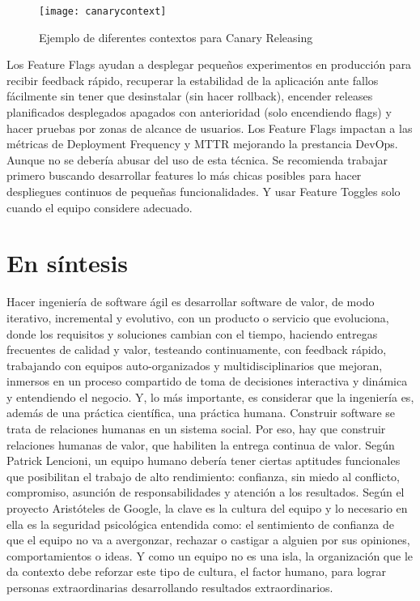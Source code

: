 \begin{itemize}
\begin{figure}[h]
  \centering
  \texttt{[image: canarycontext]}
  \caption{Ejemplo de diferentes contextos para Canary Releasing}
  \centering
  \label{fig:canarycontext} %
\end{figure}
\FloatBarrier %

\end{itemize}

Los Feature Flags ayudan a desplegar pequeños experimentos en producción para recibir feedback rápido, recuperar la estabilidad de la aplicación ante fallos fácilmente sin tener que desinstalar (sin hacer rollback), encender releases planificados desplegados apagados con anterioridad (solo encendiendo flags) y hacer pruebas por zonas de alcance de usuarios. Los Feature Flags impactan a las métricas de Deployment Frequency y MTTR mejorando la prestancia DevOps. Aunque no se debería abusar del uso de esta técnica. Se recomienda trabajar primero buscando desarrollar features lo más chicas posibles para hacer despliegues continuos de pequeñas funcionalidades. Y usar Feature Toggles solo cuando el equipo considere adecuado.

\section{En síntesis}

Hacer ingeniería de software ágil es desarrollar software de valor, de modo iterativo, incremental y evolutivo, con un producto o servicio que evoluciona, donde los requisitos y soluciones cambian con el tiempo, haciendo entregas frecuentes de calidad y valor, testeando continuamente, con feedback rápido, trabajando con equipos auto-organizados y multidisciplinarios que mejoran, inmersos en un proceso compartido de toma de decisiones interactiva y dinámica y entendiendo el negocio. Y, lo más importante, es considerar que la ingeniería es, además de una práctica científica, una práctica humana. Construir software se trata de relaciones humanas en un sistema social. Por eso, hay que construir relaciones humanas de valor, que habiliten la entrega continua de valor. Según Patrick Lencioni, un equipo humano debería tener ciertas aptitudes funcionales que posibilitan el trabajo de alto rendimiento: confianza, sin miedo al conflicto, compromiso, asunción de responsabilidades y atención a los resultados. Según el proyecto Aristóteles de Google, la clave es la cultura del equipo y lo necesario en ella es la seguridad psicológica entendida como: el sentimiento de confianza de que el equipo no va a avergonzar, rechazar o castigar a alguien por sus opiniones, comportamientos o ideas. Y como un equipo no es una isla, la organización que le da contexto debe reforzar este tipo de cultura, el factor humano, para lograr personas extraordinarias desarrollando resultados extraordinarios.
